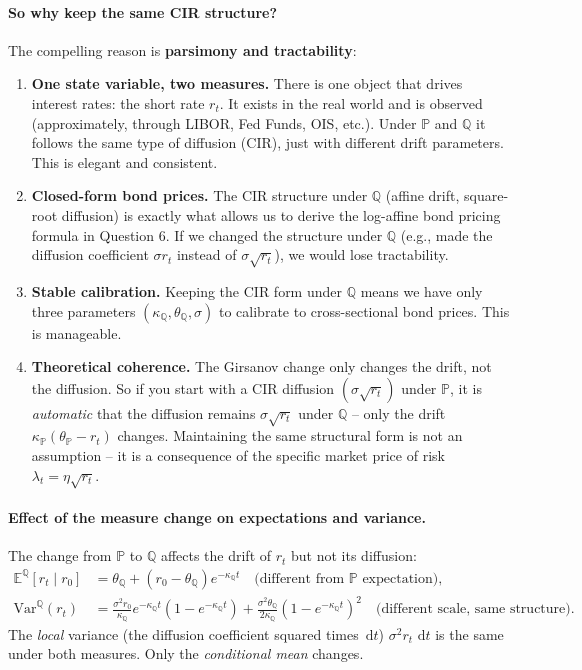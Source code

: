 \documentclass[11pt]{article}
\newcommand{\PP}{\mathbb{P}}
\newcommand{\QQ}{\mathbb{Q}}
\newcommand{\EE}{\mathbb{E}}
\newcommand{\dd}{\,\mathrm{d}}
\begin{document}
\paragraph{So why keep the same CIR structure?}
The compelling reason is \textbf{parsimony and tractability}:
\begin{enumerate}
  \item \textbf{One state variable, two measures.}  There is one object
  that drives interest rates: the short rate $r_t$.  It exists in the real
  world and is observed (approximately, through LIBOR, Fed Funds, OIS, etc.).
  Under $\PP$ and $\QQ$ it follows the same type of diffusion (CIR), just
  with different drift parameters.  This is elegant and consistent.

  \item \textbf{Closed-form bond prices.}  The CIR structure under $\QQ$
  (affine drift, square-root diffusion) is exactly what allows us to
  derive the log-affine bond pricing formula in Question 6.  If we changed
  the structure under $\QQ$ (e.g., made the diffusion coefficient $\sigma r_t$
  instead of $\sigma\sqrt{r_t}$), we would lose tractability.

  \item \textbf{Stable calibration.}  Keeping the CIR form under $\QQ$
  means we have only three parameters $(\kappa_\QQ, \theta_\QQ, \sigma)$
  to calibrate to cross-sectional bond prices.  This is manageable.

  \item \textbf{Theoretical coherence.}  The Girsanov change only changes
  the drift, not the diffusion.  So if you start with a CIR diffusion
  $(\sigma\sqrt{r_t})$ under $\PP$, it is \emph{automatic} that the
  diffusion remains $\sigma\sqrt{r_t}$ under $\QQ$ -- only the drift
  $\kappa_\PP(\theta_\PP-r_t)$ changes.  Maintaining the same structural
  form is not an assumption -- it is a consequence of the specific
  market price of risk $\lambda_t = \eta\sqrt{r_t}$.
\end{enumerate}

\paragraph{Effect of the measure change on expectations and variance.}
The change from $\PP$ to $\QQ$ affects the drift of $r_t$ but not its
diffusion:
\begin{align*}
\EE^\QQ[r_t \mid r_0] &= \theta_\QQ + (r_0-\theta_\QQ)e^{-\kappa_\QQ t}
\quad \text{(different from $\PP$ expectation)},\\
\mathrm{Var}^\QQ(r_t) &=
\frac{\sigma^2 r_0}{\kappa_\QQ}e^{-\kappa_\QQ t}(1-e^{-\kappa_\QQ t})
+\frac{\sigma^2\theta_\QQ}{2\kappa_\QQ}(1-e^{-\kappa_\QQ t})^2
\quad \text{(different scale, same structure)}.
\end{align*}
The \emph{local} variance (the diffusion coefficient squared times $\dd t$)
$\sigma^2 r_t\,\dd t$ is the same under both measures.  Only the
\emph{conditional mean} changes.
\end{document}
